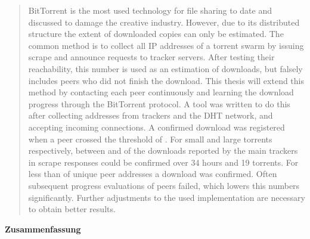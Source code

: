 \documentclass[10pt, a4paper, twoside=false, headsepline]{scrbook}
\renewcommand{\_}{\origunderscore\allowbreak}
\begin{document}
\begin{quote}
BitTorrent is the most used technology for file sharing to date and discussed to damage the creative industry. However, due to its distributed structure the extent of downloaded copies can only be estimated.
The common method is to collect all IP addresses of a torrent swarm by issuing scrape and announce requests to tracker servers. After testing their reachability, this number is used as an estimation of downloads, but falsely includes peers who did not finish the download.
This thesis will extend this method by contacting each peer continuously and learning the download progress through the BitTorrent protocol. A tool was written to do this after collecting addresses from trackers and the DHT network, and accepting incoming connections. A confirmed download was registered when a peer crossed the threshold of .
For small and large torrents respectively, between  and  of the downloads reported by the main trackers in scrape responses could be confirmed over 34 hours and 19 torrents. For less than  of unique peer addresses a download was confirmed.
Often subsequent progress evaluations of peers failed, which lowers this numbers significantly. Further adjustments to the used implementation are necessary to obtain better results.
\end{quote}

\vspace*{\fill}
\begin{center}
{\large\textbf{Zusammenfassung}}
\end{center}
\end{document}
